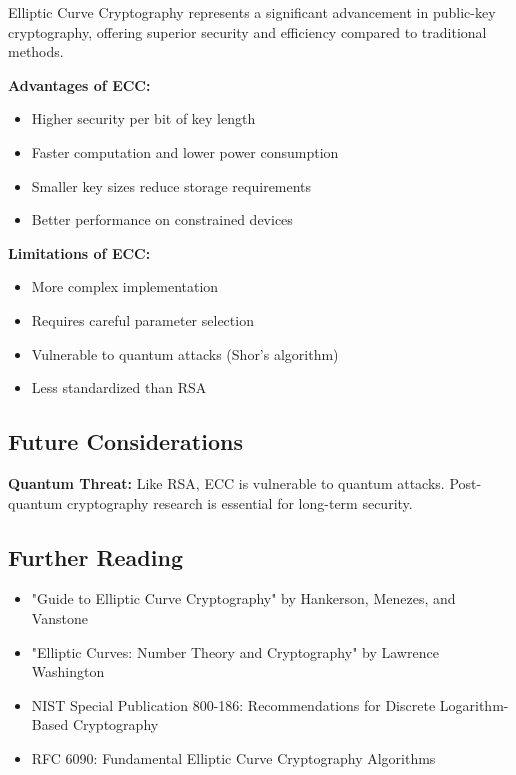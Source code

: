 \documentclass[11pt,a4paper]{article}
\begin{document}
Elliptic Curve Cryptography represents a significant advancement in public-key cryptography, offering superior security and efficiency compared to traditional methods.

\begin{prosbox}
\textbf{Advantages of ECC:}
\begin{itemize}
    \item Higher security per bit of key length
    \item Faster computation and lower power consumption
    \item Smaller key sizes reduce storage requirements
    \item Better performance on constrained devices
\end{itemize}
\end{prosbox}

\begin{consbox}
\textbf{Limitations of ECC:}
\begin{itemize}
    \item More complex implementation
    \item Requires careful parameter selection
    \item Vulnerable to quantum attacks (Shor's algorithm)
    \item Less standardized than RSA
\end{itemize}
\end{consbox}

\subsection{Future Considerations}

\begin{warningbox}
\textbf{Quantum Threat:} Like RSA, ECC is vulnerable to quantum attacks. Post-quantum cryptography research is essential for long-term security.
\end{warningbox}

\subsection{Further Reading}

\begin{itemize}
    \item "Guide to Elliptic Curve Cryptography" by Hankerson, Menezes, and Vanstone
    \item "Elliptic Curves: Number Theory and Cryptography" by Lawrence Washington
    \item NIST Special Publication 800-186: Recommendations for Discrete Logarithm-Based Cryptography
    \item RFC 6090: Fundamental Elliptic Curve Cryptography Algorithms
\end{itemize}
\end{document}
